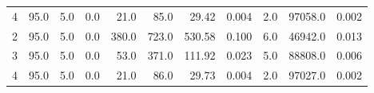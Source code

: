\begin{tabular}{lrrrrrrrrrr}
4 &                95.0 &                 5.0 &                  0.0 &          21.0 &            85.0 &            29.42 &                                         0.004 &                      2.0 &                     97058.0 &                         0.002 \\
2 &                95.0 &                 5.0 &                  0.0 &         380.0 &           723.0 &           530.58 &                                         0.100 &                      6.0 &                     46942.0 &                         0.013 \\
3 &                95.0 &                 5.0 &                  0.0 &          53.0 &           371.0 &           111.92 &                                         0.023 &                      5.0 &                     88808.0 &                         0.006 \\
4 &                95.0 &                 5.0 &                  0.0 &          21.0 &            86.0 &            29.73 &                                         0.004 &                      2.0 &                     97027.0 &                         0.002 \\
\bottomrule
\end{tabular}
